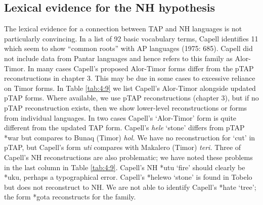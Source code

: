 \subsection{Lexical evidence for the NH hypothesis}
The lexical evidence for a connection between TAP and NH languages is not particularly convincing. In a list of 92 basic vocabulary terms, Capell identifies 11 which seem to show ``common roots'' with AP languages (1975: 685). Capell did not include data from Pantar languages and hence refers to this family as Alor-Timor. In many cases Capell's proposed Alor-Timor forms differ from the pTAP reconstructions in chapter 3. This may be due in some cases to excessive reliance on Timor forms. In Table \ref{tab:4:9} we list Capell's Alor-Timor alongside updated pTAP forms. Where available, we use pTAP reconstructions (chapter 3), but if no pTAP reconstruction exists, then we show lower-level reconstructions or forms from individual languages. In two cases Capell's `Alor-Timor' form is quite different from the updated TAP form. Capell's \textit{hele} `stone' differs from pTAP *war but compares to Bunaq (Timor) \textit{hol. }We have no reconstruction for `cut' in pTAP, but Capell's form \textit{uti }compares with Makalero (Timor)
 \textit{teri. }Three of Capell's NH reconstructions are also problematic; we have noted these problems in the last column in Table \ref{tab:4:9}. Capell's NH *utu `fire' should clearly be *uku, perhaps a typographical error. Capell's *helewo `stone' is found in Tobelo but does not reconstruct to NH. We are not able to identify Capell's *hate `tree'; the form *gota reconstructs for the family.




